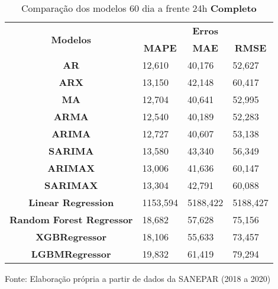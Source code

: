 \begin{table}[H]
	\centering
	\caption{Comparação dos modelos 60 dia a frente 24h \textbf{Completo} }\label{tb:60-24cm}
	\begin{tabular}{@{}clll@{}}
		\toprule
		\multirow{2}{*}{\textbf{Modelos}} & \multicolumn{3}{c}{\textbf{Erros}}                                                                       \\ \cmidrule(l){2-4} 
		& \multicolumn{1}{c}{\textbf{MAPE}} & \multicolumn{1}{c}{\textbf{MAE}} & \multicolumn{1}{c}{\textbf{RMSE}} \\ \hline
\textbf{AR}                       & 12,610                            & 40,176                           & 52,627                            \\
\textbf{ARX}                      & 13,150                            & 42,148                           & 60,417                            \\
\textbf{MA}                       & 12,704                            & 40,641                           & 52,995                            \\
\textbf{ARMA}                     & 12,540                            & 40,189                           & 52,283                            \\
\textbf{ARIMA}                    & 12,727                            & 40,607                           & 53,138                            \\
\textbf{SARIMA}                   & 13,580                            & 43,340                           & 56,349                            \\
\textbf{ARIMAX}                   & 13,006                            & 41,636                           & 60,147                            \\
\textbf{SARIMAX}                  & 13,304                            & 42,791                           & 60,088                            \\
\textbf{Linear Regression}        & 1153,594                          & 5188,422                         & 5188,427                          \\
\textbf{Random Forest Regressor}  & 18,682                            & 57,628                           & 75,156                            \\
\textbf{XGBRegressor}             & 18,106                            & 55,633                           & 73,457                            \\
\textbf{LGBMRegressor}            & 19,832                            & 61,419                           & 79,294                            \\ \bottomrule
	\end{tabular}

Fonte: Elaboração própria a partir de dados da SANEPAR (2018 a 2020)
\end{table}